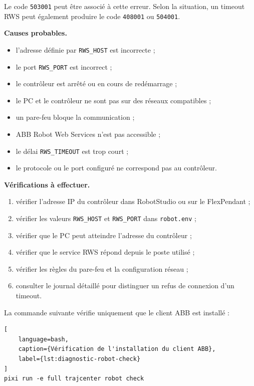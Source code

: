 \documentclass{rapportENSAM}
\begin{document}
Le code \texttt{503001} peut être associé à cette erreur. Selon la situation,
un timeout RWS peut également produire le code \texttt{408001} ou
\texttt{504001}.

\textbf{Causes probables.}

\begin{itemize}
    \item l'adresse définie par \texttt{RWS\_HOST} est incorrecte ;
    \item le port \texttt{RWS\_PORT} est incorrect ;
    \item le contrôleur est arrêté ou en cours de redémarrage ;
    \item le PC et le contrôleur ne sont pas sur des réseaux compatibles ;
    \item un pare-feu bloque la communication ;
    \item ABB Robot Web Services n'est pas accessible ;
    \item le délai \texttt{RWS\_TIMEOUT} est trop court ;
    \item le protocole ou le port configuré ne correspond pas au contrôleur.
\end{itemize}

\textbf{Vérifications à effectuer.}

\begin{enumerate}
    \item vérifier l'adresse IP du contrôleur dans RobotStudio ou sur le
    FlexPendant ;
    \item vérifier les valeurs \texttt{RWS\_HOST} et \texttt{RWS\_PORT} dans
    \texttt{robot.env} ;
    \item vérifier que le PC peut atteindre l'adresse du contrôleur ;
    \item vérifier que le service RWS répond depuis le poste utilisé ;
    \item vérifier les règles du pare-feu et la configuration réseau ;
    \item consulter le journal détaillé pour distinguer un refus de connexion
    d'un timeout.
\end{enumerate}

La commande suivante vérifie uniquement que le client ABB est installé :

\begin{lstlisting}[
    language=bash,
    caption={Vérification de l'installation du client ABB},
    label={lst:diagnostic-robot-check}
]
pixi run -e full trajcenter robot check
\end{lstlisting}
\end{document}
